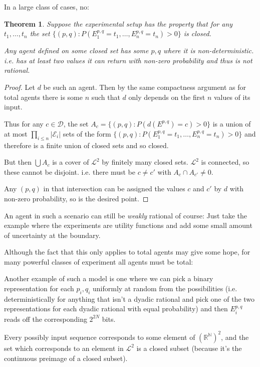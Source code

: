 \documentclass[a4paper]{book}
\newtheorem{theorem}{Theorem}
\begin{document}
In a large class of cases, no:

\begin{theorem}
Suppose the experimental setup has the property that for any $t_1, \ldots, t_n$
the set $\{(p, q): P(E^{p, q}_1 = t_1, \ldots, E^{p, q}_n = t_n) > 0\}$
is closed.

Any agent defined on some closed set has some $p, q$ where it is non-deterministic.
i.e. has at least two values it can return with non-zero probability and thus is
not rational.
\end{theorem}

\begin{proof}
Let $d$ be such an agent. Then by the same compactness argument as for total
agents there is some $n$ such that $d$ only depends on the first $n$ values of its input.

Thus for any $c \in \mathcal{D}$,
the set $A_c = \{(p, q): P(d(E^{p, q}) = c) > 0\}$
is a union of at most $\prod\limits_{i \leq n} |\mathcal{E}_i|$
sets of the form $\{(p, q): P(E^{p, q}_1 = t_1, \ldots, E^{p, q}_n = t_n) > 0\}$
and therefore is a finite union of closed sets and so closed.

But then $\bigcup A_c$
is a cover of $\mathcal{L}^2$
by finitely many closed sets. $\mathcal{L}^2$
is connected, so these cannot be disjoint. i.e. there must be $c \neq c'$ 
with $A_c \cap A_{c'} \neq 0$.

Any $(p, q)$
in that intersection can be assigned the values $c$ and $c'$
by $d$
with non-zero probability, so is the desired point.
\end{proof}

An agent in such a scenario can still be \textit{weakly} rational of course:
Just take the example where the experiments are utility functions and add some
small amount of uncertainty at the boundary.

Although the fact that this only applies to total agents may give some hope,
for many powerful classes of experiment all agents must be total:

Another example of such a model is one where we can pick a binary representation for
each $p_i, q_i$
uniformly at random from the possibilities (i.e. deterministically for anything
that isn't a dyadic rational and pick one of the two representations for each
dyadic rational with equal probability) and then $E^{p, q}_i$ reads off the
corresponding $2^{2N}$
bits.

Every possibly input sequence corresponds to some element of $(\mathbb{R^N})^2$,
and the set which corresponds to an element in $\mathcal{L}^2$
is a closed subset (because it's the continuous preimage of a closed subset).
\end{document}
